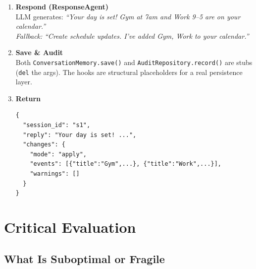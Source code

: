 \documentclass[12pt, a4paper]{article}
\begin{document}
\begin{enumerate}[leftmargin=1.6cm, label=\textbf{Step \arabic*.}]
  \item \textbf{Respond (ResponseAgent)}\\
    LLM generates: \textit{``Your day is set! Gym at 7am and Work 9--5 are on your calendar.''}\\
    \textit{Fallback:} \textit{``Create schedule updates. I've added Gym, Work to your calendar.''}

  \item \textbf{Save \& Audit}\\
    Both \texttt{ConversationMemory.save()} and \texttt{AuditRepository.record()} are stubs (\texttt{del} the args). The hooks are structural placeholders for a real persistence layer.

  \item \textbf{Return}\\
    \begin{lstlisting}[language={}]
{
  "session_id": "s1",
  "reply": "Your day is set! ...",
  "changes": {
    "mode": "apply",
    "events": [{"title":"Gym",...}, {"title":"Work",...}],
    "warnings": []
  }
}
    \end{lstlisting}
\end{enumerate}


\section{Critical Evaluation}

\subsection{What Is Suboptimal or Fragile}
\end{document}

